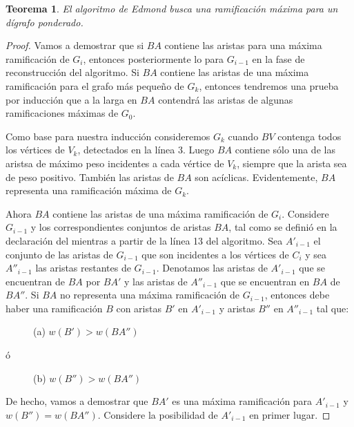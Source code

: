 \documentclass[10pt,a5paper]{book}
\newtheorem{teorema}{Teorema}[chapter]
\begin{document}
\begin{teorema}
El algoritmo de Edmond busca una ramificación máxima para un dígrafo ponderado.
\end{teorema}
\begin{proof}
Vamos a demostrar que si $BA$ contiene las aristas para una máxima ramificación de $G_i$, entonces posteriormente lo para $G_{i-1}$ en la fase de reconstrucción del algoritmo. Si $BA$ contiene las aristas de una máxima ramificación para el grafo más pequeño de $G_k$, entonces tendremos una prueba por inducción que a la larga en $BA$ contendrá las aristas de algunas ramificaciones máximas de $G_0$.

Como base para nuestra inducción consideremos $G_k$ cuando $BV$ contenga todos los vértices de $V_k$, detectados en la línea 3. Luego $BA$ contiene sólo una de las aristsa de máximo peso incidentes a cada vértice de $V_k$, siempre que la arista sea de peso positivo. También las aristas de $BA$ son acíclicas. Evidentemente, $BA$ representa una ramificación máxima de $G_k$.

Ahora $BA$ contiene las aristas de una máxima ramificación de $G_i$. Considere $G_{i-1}$ y los correspondientes conjuntos de aristas $BA$, tal como se definió en la declaración del mientras a partir de la línea 13 del algoritmo. Sea $A'_{i-1}$ el conjunto de las aristas de $G_{i-1}$ que son incidentes a los vértices de $C_i$ y sea $A''_{i-1}$ las aristas restantes de $G_{i-1}$. Denotamos las aristas de $A'_{i-1}$ que se encuentran de $BA$ por $BA'$ y las aristas de $A''_{i-1}$ que se encuentran en $BA$ de $BA''$. Si $BA$ no representa una máxima ramificación de $G_{i-1}$, entonces debe haber una ramificación $B$ con aristas $B'$ en $A'_{i-1}$ y aristas $B''$ en $A''_{i-1}$ tal que:
\begin{description}
\item[] (a) $w(B') > w(BA'')$
\end{description}
ó
\begin{description}
\item[] (b) $w(B'') > w(BA'')$
\end{description}

De hecho, vamos a demostrar que $BA'$ es una máxima ramificación para $A'_{i-1}$ y $w(B'') = w(BA'')$. Considere la posibilidad de $A'_{i-1}$ en primer lugar.


\end{proof}
\end{document}
